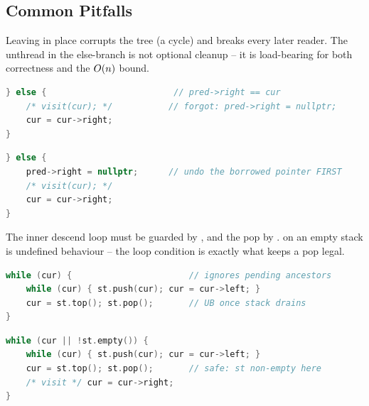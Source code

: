 \subsection{Common Pitfalls}\label{sec:c03-iterative-pitfalls}

\begin{warningbox}
Leaving  in place corrupts the tree (a cycle) and breaks every
later reader. The unthread in the else-branch is not optional cleanup -- it is load-bearing
for both correctness and the $O(n)$ bound.
\end{warningbox}
\begin{lstlisting}[caption={\textcolor{warningred}{WRONG}: visits fine but leaves threads}, language=C++, basicstyle=\ttfamily\small]
} else {                         // pred->right == cur
    /* visit(cur); */           // forgot: pred->right = nullptr;
    cur = cur->right;
}
\end{lstlisting}
\begin{lstlisting}[caption={\textcolor{successgreen}{RIGHT}: restore before moving on}, language=C++, basicstyle=\ttfamily\small]
} else {
    pred->right = nullptr;      // undo the borrowed pointer FIRST
    /* visit(cur); */
    cur = cur->right;
}
\end{lstlisting}

\begin{warningbox}
The inner descend loop must be guarded by , and the pop by
.  on an empty stack is undefined behaviour -- the
loop condition  is exactly what keeps a pop legal.
\end{warningbox}
\begin{lstlisting}[caption={\textcolor{warningred}{WRONG}: pops an empty stack at the end}, language=C++, basicstyle=\ttfamily\small]
while (cur) {                       // ignores pending ancestors
    while (cur) { st.push(cur); cur = cur->left; }
    cur = st.top(); st.pop();       // UB once stack drains
}
\end{lstlisting}
\begin{lstlisting}[caption={\textcolor{successgreen}{RIGHT}: continue while a node OR a pending ancestor exists}, language=C++, basicstyle=\ttfamily\small]
while (cur || !st.empty()) {
    while (cur) { st.push(cur); cur = cur->left; }
    cur = st.top(); st.pop();       // safe: st non-empty here
    /* visit */ cur = cur->right;
}
\end{lstlisting}

